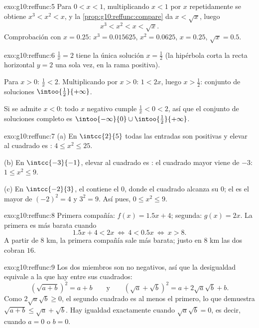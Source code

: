 \begin{solution}{exo:g10:reffunc:5}
Para $0 < x < 1$, multiplicando $x < 1$ por $x$ repetidamente se obtiene
$x^3 < x^2 < x$, y la \cref{prop:g10:reffunc:compare} da $x < \sqrt x$,
luego
\[
x^3 < x^2 < x < \sqrt x .
\]
Comprobación con $x = 0.25$: $x^3 = 0.015625$, $x^2 = 0.0625$, $x = 0.25$,
$\sqrt x = 0.5$.
\end{solution}

\begin{solution}{exo:g10:reffunc:6}
$\frac1x = 2$ tiene la única solución $x = \frac12$ (la hipérbola corta la
recta horizontal $y = 2$ una sola vez, en la rama positiva).

Para $x > 0$: $\frac1x < 2$. Multiplicando por $x > 0$: $1 < 2x$, luego
$x > \frac12$: conjunto de soluciones $\intoo{\frac12}{+\infty}$.

Si se admite $x < 0$: todo $x$ negativo cumple $\frac1x < 0 < 2$, así que
el conjunto de soluciones completo es
$\intoo{-\infty}{0} \cup \intoo{\frac12}{+\infty}$.
\end{solution}

\begin{solution}{exo:g10:reffunc:7}
(a) En $\intcc{2}{5}$ todas las entradas son positivas y elevar al
cuadrado es : $4 \leq x^2 \leq 25$.

(b) En $\intcc{-3}{-1}$, elevar al cuadrado es : el cuadrado
mayor viene de $-3$: $1 \leq x^2 \leq 9$.

(c) En $\intcc{-2}{3}$, el  contiene el $0$, donde el cuadrado
alcanza su  $0$; el  es el mayor de $(-2)^2 = 4$ y $3^2 = 9$.
Así pues, $0 \leq x^2 \leq 9$.
\end{solution}

\begin{solution}{exo:g10:reffunc:8}
Primera compañía: $f(x) = 1.5x + 4$; segunda: $g(x) = 2x$. La primera es
más barata cuando
\[
1.5x + 4 < 2x
\ \Longleftrightarrow\
4 < 0.5x
\ \Longleftrightarrow\
x > 8 .
\]
A partir de $8$ km, la primera compañía sale más barata; justo en $8$ km
las dos cobran $16$.
\end{solution}

\begin{solution}{exo:g10:reffunc:9}
Los dos miembros son no negativos, así que la desigualdad equivale a la
que hay entre sus cuadrados:
\[
\left(\sqrt{a+b}\right)^2 = a + b
\qquad\text{y}\qquad
\left(\sqrt a + \sqrt b\right)^2 = a + 2\sqrt a \sqrt b + b .
\]
Como $2\sqrt a\sqrt b \geq 0$, el segundo cuadrado es al menos el
primero, lo que demuestra $\sqrt{a+b} \leq \sqrt a + \sqrt b$. Hay
igualdad exactamente cuando $\sqrt a \sqrt b = 0$, es decir, cuando
$a = 0$ o $b = 0$.
\end{solution}

